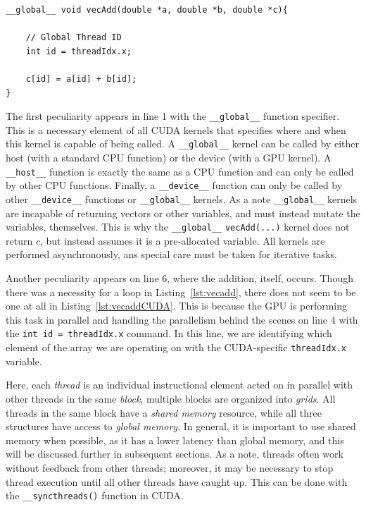 \begin{lstlisting}[float,label=lst:vecaddCUDA, style=c++,caption=An example of a vector addition kernel in CUDA]
__global__ void vecAdd(double *a, double *b, double *c){

    // Global Thread ID
    int id = threadIdx.x;

    c[id] = a[id] + b[id];
}
\end{lstlisting}

The first peculiarity appears in line 1 with the \texttt{\_\_global\_\_} function specifier.
This is a necessary element of all CUDA kernels that specifies where and when this kernel is capable of being called.
A \texttt{\_\_global\_\_} kernel can be called by either host (with a standard CPU function) or the device (with a GPU kernel).
A \texttt{\_\_host\_\_} function is exactly the same as a CPU function and can only be called by other CPU functions.
Finally, a \texttt{\_\_device\_\_} function can only be called by other \texttt{\_\_device\_\_} functions or \texttt{\_\_global\_\_} kernels.
As a note \texttt{\_\_global\_\_} kernels are incapable of returning vectors or other variables, and must instead mutate the variables, themselves.
This is why the \texttt{\_\_global\_\_} \texttt{vecAdd(...)} kernel does not return $c$, but instead assumes it is a pre-allocated variable.
All kernels are performed asynchronously, ans special care must be taken for iterative tasks.

Another peculiarity appears on line 6, where the addition, itself, occurs.
Though there was a necessity for a loop in Listing~\ref{lst:vecadd}, there does not seem to be one at all in Listing~\ref{lst:vecaddCUDA}.
This is because the GPU is performing this task in parallel and handling the parallelism behind the scenes on line 4 with the \texttt{int id = threadIdx.x} command.
In this line, we are identifying which element of the array we are operating on with the CUDA-specific \texttt{threadIdx.x} variable.

Here, each \textit{thread} is an individual instructional element acted on in parallel with other threads in the same \textit{block}, multiple blocks are organized into \textit{grids}.
All threads in the same block have a \textit{shared memory} resource, while all three structures have access to \textit{global memory}.
In general, it is important to use shared memory when possible, as it has a lower latency than global memory, and this will be discussed further in subsequent sections.
As a note, threads often work without feedback from other threads; moreover, it may be necessary to stop thread execution until all other threads have caught up.
This can be done with the \texttt{\_\_syncthreads()} function in CUDA.

